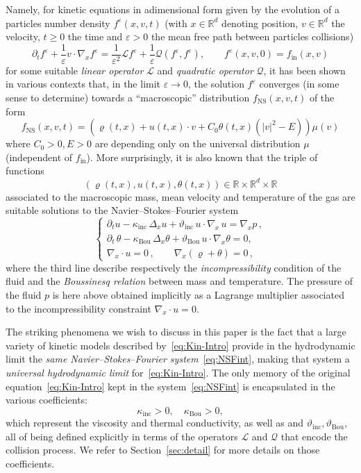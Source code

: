 \documentclass[AHL,Unicode,longabstracts,published]{cedram}
\newcommand{\ini}{\mathrm{in}}
\newcommand{\ns}{\mathrm{NS}}
\newcommand{\Inc}{\mathrm{inc}}
\newcommand{\Bou}{\mathrm{Bou}}
\newcommand{\R}{\mathbb{R}}
\newcommand{\LL}{\mathcal{L}}
\newcommand{\QQ}{\mathcal{Q}}
\renewcommand*\ge{\geqslant}
\newcommand*\eps{{\varepsilon}}
\begin{document}
Namely, for kinetic equations in adimensional form given by the evolution of a {particles number} density $f^{\eps}(x,v,t)$ {(with $x \in \R^d$ denoting position, $v \in \R^d$ the velocity, $t \ge 0$ the time and $\eps > 0$ the mean free path between particles collisions)}
\begin{equation}\label{eq:Kin-Intro}
\partial_{t}f^{\eps}+\frac{1}{\eps}v\cdot \nabla_{x}f^{\eps} =\frac{1}{\eps^{2}}\LL f^{\eps} + \frac{1}{\eps}\QQ\left(f^{\eps},f^{\eps}\right), \qquad f^{\eps}(x,v,0)=f_{\ini}(x,v)
\end{equation}
for some suitable \emph{linear operator} $\LL$ and \emph{quadratic operator} $\QQ$, it has been shown in various contexts that, in the limit $\eps \to 0$, the solution $f^{\eps}$ converges (in some sense to determine) towards a ``macroscopic'' distribution $f_{\ns}(x,v,t)$ of the form
\begin{equation}\label{eq:11}
f_{\ns}(x,v,t)= \left(\varrho(t, x) + u(t, x) \cdot v + C_{0}\theta(t, x)\left(|v|^2 - E \right)\right) \mu(v)
\end{equation}
where $C_{0} >0,E >0$ are depending {only on the universal distribution $\mu$ (independent of $f_\ini$)}. More surprisingly, it is also known that the triple of functions
\[
(\varrho(t,x),u(t,x),\theta(t,x)) \in \R \times \R^{d}\times \R
\]
{associated to} the macroscopic mass, mean velocity and temperature of the gas are suitable solutions to the Navier--Stokes--Fourier system
\begin{equation}\label{eq:NSFint}
\begin{cases}
\partial_{t}u-\kappa_{\Inc}\,\Delta_{x}u + \vartheta_{\Inc}\,u\cdot \nabla_{x}\,u = \nabla_{x}p \,,\\[6pt]
\partial_{t}\,\theta-\kappa_{\Bou}\,\Delta_{x}\theta +\vartheta_{\Bou}\,u\cdot \nabla_{x}\theta=0,\\[8pt]
\nabla_{x}\cdot u=0\,, \qquad \nabla_x\left(\varrho + \theta\right)= 0\,,
\end{cases}
\end{equation}
where the third line describe respectively the \emph{incompressibility} condition of the fluid and the \emph{Boussinesq relation} between mass and temperature. The pressure of the fluid $p$ is here above obtained implicitly as a Lagrange multiplier associated to the incompressibility constraint $\nabla_{x}\cdot u=0.$

The striking phenomena we wish to discuss in this paper is the fact that a large variety of kinetic models described by~\eqref{eq:Kin-Intro} provide in the hydrodynamic limit the \emph{same Navier--Stokes--Fourier system}~\eqref{eq:NSFint}, making that system a \emph{universal hydrodynamic limit} for~\eqref{eq:Kin-Intro}. The only memory of the original equation~\eqref{eq:Kin-Intro} kept in the system~\eqref{eq:NSFint} is encapsulated in the various coefficients:
\[
\kappa_{\Inc} >0, \quad \kappa_{\Bou} >0,
\]
which represent the viscosity and thermal conductivity, as well as and $\vartheta_\Inc,\vartheta_\Bou$, all of being defined explicitly in terms of the operators $\LL$ and $\QQ$ that encode the collision process. We refer to Section~\ref{sec:detail} for more details on those coefficients.
\end{document}

